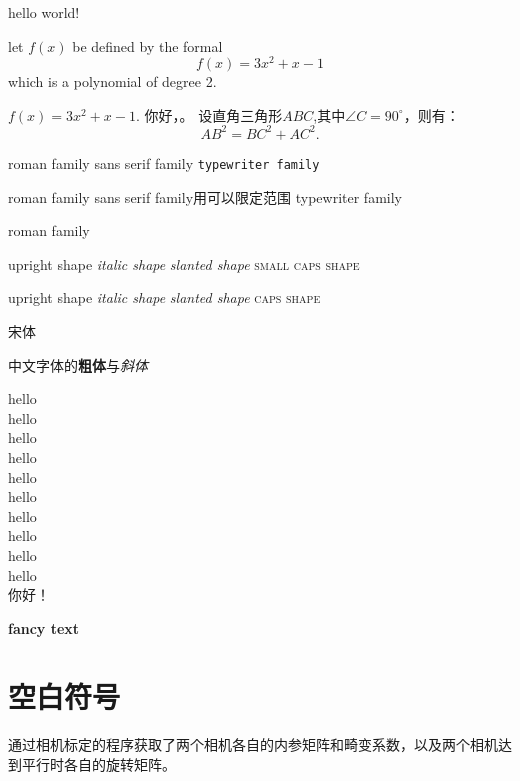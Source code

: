 \documentclass[10pt]{ctexart}%
\newcommand\degree{^\circ}
\newcommand{\myfont}{\textbf{\textsf{fancy text}}}
\begin{document}
	
	\maketitle
	
	hello world!
	

	
	let $f(x)$ be defined by the formal
	$$f(x)=3x^2+x-1$$ which is a polynomial of degree 2.
	
	$f(x)=3x^2+x-1$.
	你好，\LaTeXe 。  
	设直角三角形$ABC$,其中$\angle C=90\degree$，则有：
	\begin{equation}%
	AB^2=BC^2+AC^2.
	\end{equation}
	
	\textrm{roman family}     \textsf{sans serif family}    \texttt{typewriter family}
	
	{\rmfamily roman family}
	{\sffamily sans serif family}用{}可以限定范围
	{\ttfamily typewriter family}
	
	
	\rmfamily roman family
	
	\textup{upright shape}   \textit{italic shape}
	\textsl{slanted shape}   \textsc{small caps shape}
	
	{\upshape upright shape} {\itshape italic shape}
	{\slshape slanted shape} {\scshape caps shape}	
	
	{\songti 宋体}    
	
	中文字体的\textbf{粗体}与\textit{斜体}
	
	{\tiny  hello}\\
	{\scriptsize hello}\\
	{\footnotesize hello}\\
	{\small hello}\\
	{\normalsize hello}\\
	{\large hello}\\
	{\Large hello}\\
	{\LARGE hello}\\
	{\huge hello}\\
	{\Huge hello}\\
	
	{ 你好！}%
	
	\myfont 
	
	\section{空白符号}
	通过相机标定的程序获取了两个相机各自的内参矩阵和畸变系数，以及两个相机达到平行时各自的旋转矩阵。
	
\end{document}
